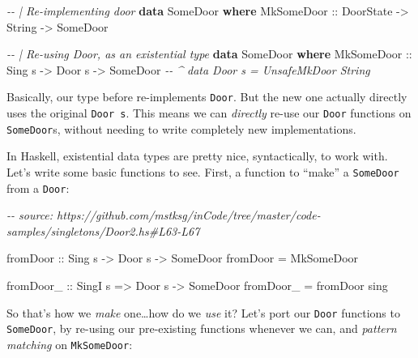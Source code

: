 \documentclass[]{article}
\newenvironment{Shaded}{}{}
\newcommand{\CommentTok}[1]{\textcolor[rgb]{0.38,0.63,0.69}{\textit{#1}}}
\newcommand{\DataTypeTok}[1]{\textcolor[rgb]{0.56,0.13,0.00}{#1}}
\newcommand{\KeywordTok}[1]{\textcolor[rgb]{0.00,0.44,0.13}{\textbf{#1}}}
\newcommand{\NormalTok}[1]{#1}
\newcommand{\OtherTok}[1]{\textcolor[rgb]{0.00,0.44,0.13}{#1}}
\begin{document}
\begin{Shaded}
\begin{Highlighting}[]
\CommentTok{{-}{-} | Re{-}implementing door}
\KeywordTok{data} \DataTypeTok{SomeDoor} \KeywordTok{where}
    \DataTypeTok{MkSomeDoor}\OtherTok{ ::} \DataTypeTok{DoorState} \OtherTok{{-}\textgreater{}} \DataTypeTok{String} \OtherTok{{-}\textgreater{}} \DataTypeTok{SomeDoor}

\CommentTok{{-}{-} | Re{-}using Door, as an existential type}
\KeywordTok{data} \DataTypeTok{SomeDoor} \KeywordTok{where}
    \DataTypeTok{MkSomeDoor}\OtherTok{  ::} \DataTypeTok{Sing}\NormalTok{ s  }\OtherTok{{-}\textgreater{}} \DataTypeTok{Door}\NormalTok{ s }\OtherTok{{-}\textgreater{}} \DataTypeTok{SomeDoor}
                            \CommentTok{{-}{-} \^{} data Door s = UnsafeMkDoor String}
\end{Highlighting}
\end{Shaded}

Basically, our type before re-implements \texttt{Door}. But the new one actually
directly uses the original \texttt{Door\ s}. This means we can \emph{directly}
re-use our \texttt{Door} functions on \texttt{SomeDoor}s, without needing to
write completely new implementations.

In Haskell, existential data types are pretty nice, syntactically, to work with.
Let's write some basic functions to see. First, a function to ``make'' a
\texttt{SomeDoor} from a \texttt{Door}:

\begin{Shaded}
\begin{Highlighting}[]
\CommentTok{{-}{-} source: https://github.com/mstksg/inCode/tree/master/code{-}samples/singletons/Door2.hs\#L63{-}L67}

\OtherTok{fromDoor ::} \DataTypeTok{Sing}\NormalTok{ s }\OtherTok{{-}\textgreater{}} \DataTypeTok{Door}\NormalTok{ s }\OtherTok{{-}\textgreater{}} \DataTypeTok{SomeDoor}
\NormalTok{fromDoor }\OtherTok{=} \DataTypeTok{MkSomeDoor}

\OtherTok{fromDoor\_ ::} \DataTypeTok{SingI}\NormalTok{ s }\OtherTok{=\textgreater{}} \DataTypeTok{Door}\NormalTok{ s }\OtherTok{{-}\textgreater{}} \DataTypeTok{SomeDoor}
\NormalTok{fromDoor\_ }\OtherTok{=}\NormalTok{ fromDoor sing}
\end{Highlighting}
\end{Shaded}

So that's how we \emph{make} one\ldots how do we \emph{use} it? Let's port our
\texttt{Door} functions to \texttt{SomeDoor}, by re-using our pre-existing
functions whenever we can, and \emph{pattern matching} on \texttt{MkSomeDoor}:
\end{document}
